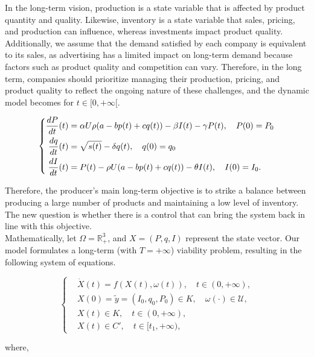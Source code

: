 \documentclass[]{interact}
\theoremstyle{plain}%
\theoremstyle{definition}
\theoremstyle{remark}
\begin{document}
In the long-term vision, production is a state variable that is affected by product quantity and quality. Likewise, inventory is a state variable that sales, pricing, and production can influence, whereas investments impact product quality. Additionally, we assume that the demand satisfied by each company is equivalent to its sales, as advertising has a limited impact on long-term demand because factors such as product quality and competition can vary. Therefore, in the long term, companies should prioritize managing their production, pricing, and product quality to reflect the ongoing nature of these challenges, and the dynamic model becomes for $t \in [0, + \infty[$.


\begin{equation}
	\centering
	\left\{\begin{split}
	\frac{dP}{dt}(t)    &  = \alpha U \rho(a-b p(t)+c q(t)) - \beta I(t)- \gamma P(t), \quad P(0) = P_0\\
		\frac{dq}{dt}(t) 	&  = \sqrt{s(t)} - \delta q(t), \quad q(0) = q_0\\
		\frac{dI}{dt}(t)         &  = P(t) - \rho U (a-b p(t)+c q(t)) -\theta I(t), \quad  I(0) = I_{0}.
	\end{split}\right.
\end{equation}

Therefore, the producer's main long-term objective is to strike a balance between producing a large number of products and maintaining a low level of inventory. The new question is whether there is a control that can bring the system back in line with this objective. \\ Mathematically, let \(\Omega = \mathbb{R}_+^3\), and $X=(P, q, I)$ represent the state vector. Our model formulates a long-term (with $T= +\infty$) viability problem, resulting in the following system of equations.

\begin{equation}
\left\{
\begin{aligned}
    &\dot{X}(t) = f(X(t), \omega(t)), \quad t \in (0, +\infty), \\
    & X(0) = \tilde{y} = (I_{0}, q_{0}, P_{0}) \in K, \quad \omega(\cdot) \in \mathcal{U}, \\
    & X(t) \in K, \quad t \in (0, +\infty), \\
    &X(t) \in C', \quad t \in [t_{1}, +\infty),    
\end{aligned}
\right.
\end{equation}

where, 
\end{document}
